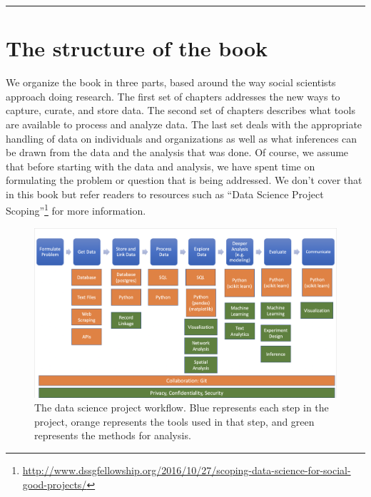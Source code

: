 \documentclass[]{krantz}
\begin{document}
\begin{center}\rule{0.5\linewidth}{\linethickness}\end{center}

\section{The structure of the book}\label{the-structure-of-the-book}

We organize the book in three parts, based around the way social
scientists approach doing research. The first set of chapters addresses
the new ways to capture, curate, and store data. The second set of
chapters describes what tools are available to process and analyze data.
The last set deals with the appropriate handling of data on individuals
and organizations as well as what inferences can be drawn from the data
and the analysis that was done. Of course, we assume that before
starting with the data and analysis, we have spent time on formulating
the problem or question that is being addressed. We don't cover that in
this book but refer readers to resources such as ``Data Science Project
Scoping''\footnote{\url{http://www.dssgfellowship.org/2016/10/27/scoping-data-science-for-social-good-projects/}}
for more information.

\begin{figure}

{\centering \includegraphics[width=1\linewidth]{ChapterIntro/figures/projectflow} 

}

\caption{The data science project workflow. Blue represents each step in the project, orange represents the tools used in that step, and green represents the methods for analysis.}\label{fig:projectfig}
\end{figure}
\end{document}
